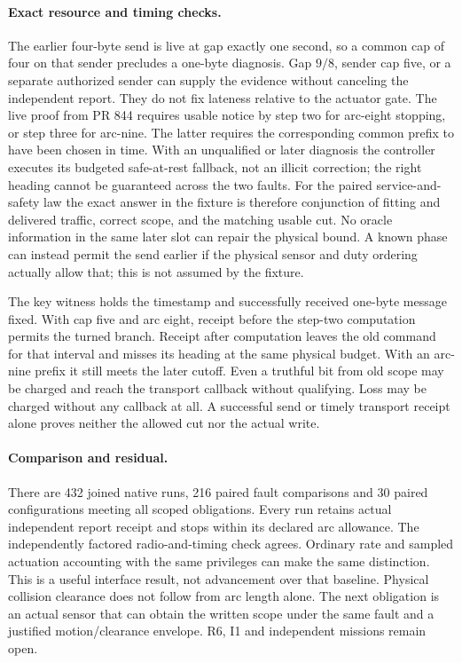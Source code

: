 \documentclass{article}
\begin{document}
\paragraph{Exact resource and timing checks.}
The earlier four-byte send is live at gap exactly one second,
so a common cap of four on that sender precludes a one-byte
diagnosis. Gap \(9/8\), sender cap five, or a separate authorized
sender can supply the evidence without canceling the independent
report. They do not fix lateness relative to the actuator gate.
The live proof from PR 844 requires usable notice by step two for
arc-eight stopping, or step three for arc-nine. The latter
requires the corresponding common prefix to have been chosen
in time. With an unqualified or later diagnosis the controller
executes its budgeted safe-at-rest fallback, not an illicit
correction; the right heading cannot be guaranteed across the
two faults. For the paired service-and-safety law the exact
answer in the fixture is therefore conjunction of fitting and
delivered traffic, correct scope, and the matching usable cut.
No oracle information in the same later slot can repair the
physical bound. A known phase can instead permit the send
earlier if the physical sensor and duty ordering actually
allow that; this is not assumed by the fixture.

The key witness holds the timestamp and successfully received
one-byte message fixed. With cap five and arc eight, receipt
before the step-two computation permits the turned branch.
Receipt after computation leaves the old command for that interval
and misses its heading at the same physical budget.
With an arc-nine prefix it still meets the later cutoff.
Even a truthful bit from old scope may be charged and reach
the transport callback without qualifying. Loss may be charged
without any callback at all. A successful send or timely
transport receipt alone proves neither the allowed cut nor
the actual write.

\paragraph{Comparison and residual.}
There are 432 joined native runs, 216 paired fault comparisons
and 30 paired configurations meeting all scoped obligations.
Every run retains actual independent report receipt and stops
within its declared arc allowance. The independently factored
radio-and-timing check agrees. Ordinary rate and sampled
actuation accounting with the same privileges can make the
same distinction. This is a useful interface result, not
advancement over that baseline. Physical collision clearance
does not follow from arc length alone. The next obligation
is an actual sensor that can obtain the written scope under the
same fault and a justified motion/clearance envelope.
R6, I1 and independent missions remain open.
\end{document}
